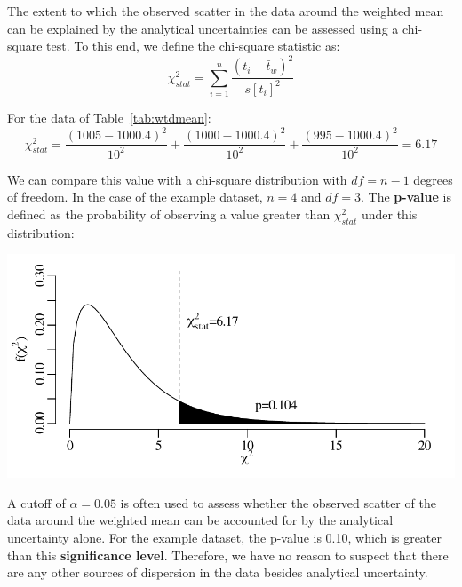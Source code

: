 \begin{refsection}
The extent to which the observed scatter in the data around the
weighted mean can be explained by the analytical uncertainties can be
assessed using a chi-square test.  To this end, we define the
chi-square statistic as:
\begin{equation}
  \chi^2_{stat} = \sum\limits_{i=1}^{n}\frac{(t_i-\bar{t}_w)^2}{s[t_i]^2}
  \label{eq:chi2wtdmean}
\end{equation}

For the data of Table~\ref{tab:wtdmean}:
\[
\chi^2_{stat} = \frac{(1005-1000.4)^2}{10^2}
+ \frac{(1000-1000.4)^2}{10^2}
+ \frac{(995-1000.4)^2}{10^2} = 6.17
\]
  
We can compare this value with a chi-square distribution with $df = n
- 1$ degrees of freedom. In the case of the example dataset, $n=4$ and
$df=3$. The \textbf{p-value} is defined as the probability of
observing a value greater than $\chi_{stat}^2$ under this
distribution:

\noindent\begin{minipage}[t]{.7\textwidth}
\strut\vspace*{-\baselineskip}\newline
\includegraphics[width=\textwidth]{../figures/chi2wtdmean.pdf}
\end{minipage}
\begin{minipage}[t]{.3\textwidth}
  \label{fig:chi2}
\end{minipage}

A cutoff of $\alpha=0.05$ is often used to assess whether the observed
scatter of the data around the weighted mean can be accounted for by
the analytical uncertainty alone.  For the example dataset, the
p-value is 0.10, which is greater than this \textbf{significance
  level}. Therefore, we have no reason to suspect that there are any
other sources of dispersion in the data besides analytical
uncertainty.\\


\end{refsection}
